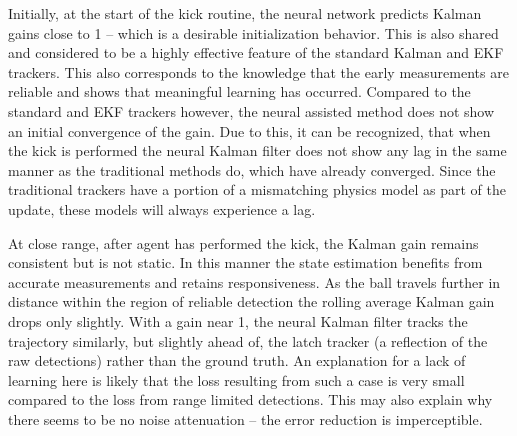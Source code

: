 \documentclass[a4paper,twoside,12pt]{report}
\begin{document}


Initially, at the start of the kick routine, the neural network predicts Kalman gains close to 1 -- which is a desirable initialization behavior. This is also shared and considered to be a highly effective feature of the standard Kalman and EKF trackers. This also corresponds to the knowledge that the early measurements are reliable and shows that meaningful learning has occurred. Compared to the standard and EKF trackers however, the neural assisted method does not show an initial convergence of the gain. Due to this, it can be recognized, that when the kick is performed the neural Kalman filter does not show any lag in the same manner as the traditional methods do, which have already converged. Since the traditional trackers have a portion of a mismatching physics model as part of the update, these models will always experience a lag.

At close range, after agent has performed the kick, the Kalman gain remains consistent but is not static. In this manner the state estimation benefits from accurate measurements and retains responsiveness. As the ball travels further in distance within the region of reliable detection the rolling average Kalman gain drops only slightly. With a gain near 1, the neural Kalman filter tracks the trajectory similarly, but slightly ahead of, the latch tracker (a reflection of the raw detections) rather than the ground truth. An explanation for a lack of learning here is likely that the loss resulting from such a case is very small compared to the loss from range limited detections. This may also explain why there seems to be no noise attenuation -- the error reduction is imperceptible.
\end{document}
